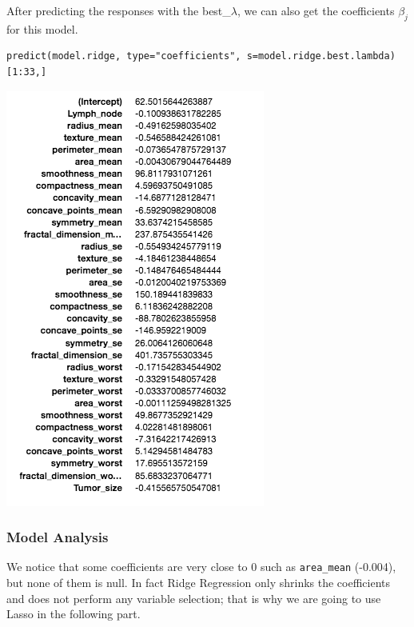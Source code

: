 \documentclass[]{report}
\begin{document}
After predicting the responses with the best\_$\lambda$,  we can also get the coefficients $\beta_{j}$ for this model.

\begin{lstlisting}
predict(model.ridge, type="coefficients", s=model.ridge.best.lambda)[1:33,]
\end{lstlisting}

\begin{center}
	\includegraphics[width=0.8\linewidth]{Figures/ridge_coeff}
\end{center}

\subsubsection{Model Analysis} \label{Ridge Model Analysis}
We notice that some coefficients are very close to 0 such as \texttt{area\_mean} (-0.004), but none of them is null. In fact Ridge Regression only shrinks the coefficients and does not perform any variable selection;  that is why we are going to use Lasso in the following part.\\
\end{document}
